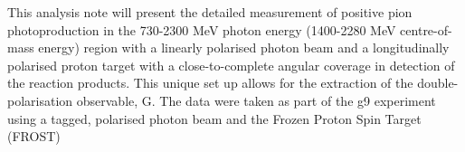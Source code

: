 This analysis note will present the detailed measurement of positive pion photoproduction in the 730-2300 MeV photon energy (1400-2280 MeV centre-of-mass energy) region with a linearly polarised photon beam and a longitudinally polarised proton target with a close-to-complete angular coverage in detection of the reaction products. This unique set up allows for the extraction of the double-polarisation observable, G. The data were taken as part of the g9 experiment using a tagged, polarised photon beam and the Frozen Proton Spin Target (FROST)

